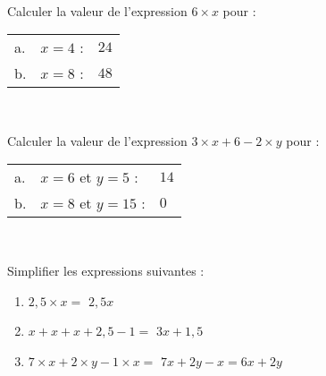 \documentclass[a4paper,12pt,landscape,twocolumn]{article}
\newcommand{\correction}[1]{{\color{red}#1}}
\begin{document}
{	\begin{exercice}\

		Calculer la valeur de l'expression $6 × x$ pour : \vspace{0.5em}

		\begin{tabular}{lll}
			a. & $x = 4$ : & \correction{$24$} \\
			b. & $x = 8$ : & \correction{$48$} \\
		\end{tabular}
	\end{exercice}

	\begin{exercice}\

		Calculer la valeur de l'expression $3 × x + 6 - 2 × y$ pour : \vspace{0.5em}

		\begin{tabular}{lll}
			a. & $x = 6$ et $y = 5$ :  & \correction{$14$} \\
			b. & $x = 8$ et $y = 15$ : & \correction{$0$}  \\
		\end{tabular}
	\end{exercice}

	\begin{exercice}\

		Simplifier les expressions suivantes : \vspace{0.5em}
		\begin{enumerate}[label=\alph*.]
			\setlength\itemsep{5pt}
			\item $2{,}5 × x = $ \correction{$2{,}5x$}
			\item $x + x + x + 2{,}5 - 1 = $ \correction{$3x + 1{,}5$}
			\item $7 × x + 2 × y  - 1 × x = $ \correction{$7x + 2y - x = 6x + 2y$}
		\end{enumerate}
	\end{exercice}
}

\newpage

\setcounter{exercice}{0}
\end{document}
